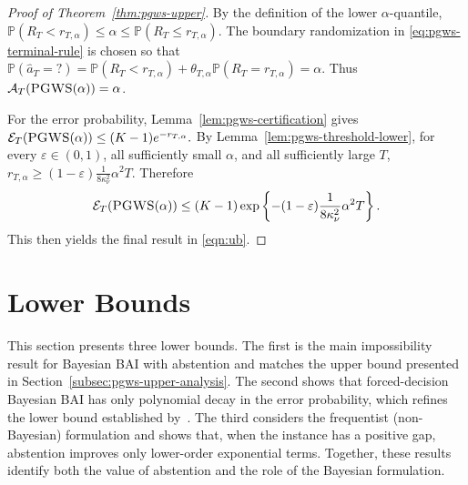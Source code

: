 \documentclass[10pt]{article}
\newcommand{\ouralg}{{\textnormal{\textsc{PGWS}}}}
\theoremstyle{plain}
\begin{document}
\begin{proof}[Proof of Theorem~\ref{thm:pgws-upper}]
By the definition of the lower $\alpha$-quantile,
$ 
    \mathbb P(R_T<r_{T,\alpha})
    \le
    \alpha
    \le
    \mathbb P(R_T\le r_{T,\alpha}).
$
The boundary randomization in \eqref{eq:pgws-terminal-rule} is chosen so that
$ 
    \mathbb P(\hat a_T=?)
    =
    \mathbb P(R_T<r_{T,\alpha})
    +
    \theta_{T,\alpha}\mathbb P(R_T=r_{T,\alpha})
    =
    \alpha.
$ 
Thus $\mathcal A_T(\ouralg(\alpha))=\alpha$.

For the error probability, Lemma~\ref{lem:pgws-certification} gives
$ 
    \mathcal E_T(\ouralg(\alpha))
    \le
    (K-1)e^{-r_{T,\alpha}}.
$
By Lemma~\ref{lem:pgws-threshold-lower}, for every $\varepsilon\in(0,1)$, all
sufficiently small $\alpha$, and all sufficiently large $T$,
$ 
    r_{T,\alpha}
    \ge
    (1-\varepsilon) \frac{1}{8\kappa_\nu^2}\alpha^2T.
$
Therefore
\[
    \mathcal E_T(\ouralg(\alpha))
    \le
    (K-1)
    \exp \left\{
        -(1-\varepsilon) \frac{1}{8\kappa_\nu^2}\alpha^2T
    \right\}.
\]
This then yields the final result in \eqref{eqn:ub}.  

\end{proof}












\section{Lower Bounds}
\label{sec:lower-bounds}

This section presents three lower bounds. The first is the main impossibility result for
Bayesian BAI with abstention and matches the upper bound presented in
Section~\ref{subsec:pgws-upper-analysis}. The second
shows that  forced-decision Bayesian BAI has only polynomial decay in the error probability, which refines the lower bound established by~\citet{atsidakou2023bayesian}. The third considers the
frequentist (non-Bayesian) formulation and shows that, when the instance has a positive gap,
abstention improves only lower-order exponential terms. Together, these results
identify both the value of abstention and the role of the Bayesian formulation.
\end{document}
